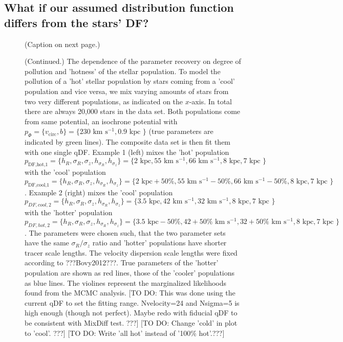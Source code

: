 \documentclass[12pt,preprint]{aastex}
\begin{document}
\subsection{What if our assumed distribution function differs from the stars' DF?}



\begin{figure}
\caption{(Caption on next page.)}
\end{figure}

\addtocounter{figure}{-1}
\begin{figure} [t!]
  \caption{(Continued.)  The dependence of the parameter recovery on degree of pollution and 'hotness' of the stellar population. To model the pollution of a 'hot' stellar population by stars coming from a 'cool' population and vice versa, we mix varying amounts of stars from two very different populations, as indicated on the $x$-axis. In total there are always 20,000 stars in the data set. Both populations come from same potential, an isochrone potential with $p_\Phi = \{v_\text{circ},b \}=\{230 \text{ km s$^{-1}$},0.9\text{ kpc } \}$ (true parameters are indicated by green lines). The composite data set is then fit them with one single qDF. Example 1 (left) mixes the 'hot' population $p_\text{DF,hot,1} = \{ h_R, \sigma_R, \sigma_z,h_{\sigma_R},h_{\sigma_z}\} =\{2 \text{ kpc}, 55 \text{ km s$^{-1}$}, 66 \text{ km s$^{-1}$}, 8 \text{ kpc}, 7 \text{ kpc }\} $ with the 'cool' population $p_\text{DF,cool,1} = \{ h_R, \sigma_R, \sigma_z,h_{\sigma_R},h_{\sigma_z}\} =\{2 \text{ kpc}+50\%, 55 \text{ km s$^{-1}$}-50\%, 66 \text{ km s$^{-1}$}-50\%, 8 \text{ kpc}, 7 \text{ kpc }\}$. Example 2 (right) mixes the 'cool' population $p_{DF,cool,2} = \{ h_R, \sigma_R, \sigma_z,h_{\sigma_R},h_{\sigma_z}\} =\{3.5 \text{ kpc}, 42 \text{ km s$^{-1}$}, 32 \text{ km s$^{-1}$}, 8 \text{ kpc}, 7 \text{ kpc }\} $ with the 'hotter' population $p_{DF,hot,2} = \{ h_R, \sigma_R, \sigma_z,h_{\sigma_R},h_{\sigma_z}\} =\{3.5 \text{ kpc}-50\%, 42+50\% \text{ km s$^{-1}$}, 32+50\% \text{ km s$^{-1}$}, 8 \text{ kpc}, 7 \text{ kpc }\} $. The parameters were chosen such, that the two parameter sets have the same $\sigma_R/\sigma_z$ ratio and 'hotter' populations have shorter tracer scale lengths. The velocity dispersion scale lengths were fixed according to ???Bovy2012???. True parameters of the 'hotter' population are shown as red lines, those of the 'cooler' populations as blue lines. The violines represent the marginalized likelihoods found from the MCMC analysis. [TO DO: This was done using the current qDF to set the fitting range. Nvelocity=24 and Nsigma=5 is high enough (though not perfect). Maybe redo with fiducial qDF to be consistent with MixDiff test. ???] [TO DO: Change 'cold' in plot to 'cool'. ???] [TO DO: Write 'all hot' instead of '100\% hot'.???]}
\end{figure}
\end{document}

